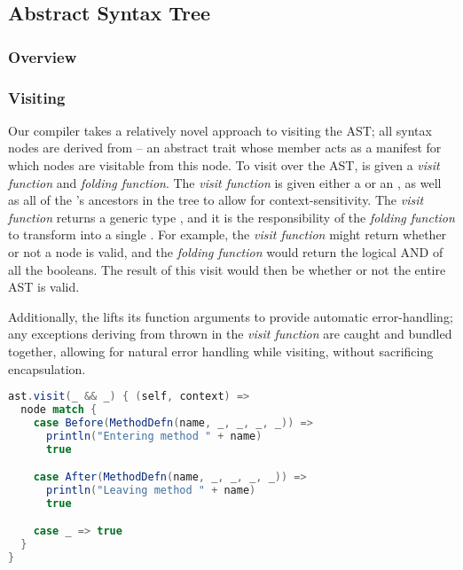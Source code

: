 \documentclass{article}
\begin{document}
\subsection{Abstract Syntax Tree}

\subsubsection{Overview}

\subsubsection{Visiting}

Our compiler takes a relatively novel approach to visiting the AST; all syntax nodes are derived from 
-- an abstract trait whose \value{children} member acts as a manifest for which nodes are visitable from this node. To
visit over the AST,  is given a \textit{visit function} and \textit{folding function}. The \textit{visit
function} is given either a \value{Before(Node)} or an \value{After(Node)}, as well as all of the \value{Node}'s
ancestors in the tree to allow for context-sensitivity. The \textit{visit function} returns a generic type ,
and it is the responsibility of the \textit{folding function} to transform  into a single . For
example, the \textit{visit function} might return whether or not a node is valid, and the \textit{folding function}
would return the logical AND of all the booleans. The result of this visit would then be whether or not the entire AST
is valid.

Additionally, the \value{Visitor} lifts its function arguments to provide automatic error-handling; any exceptions
deriving from  thrown in the \textit{visit function} are caught and bundled together, allowing for
natural error handling while visiting, without sacrificing encapsulation.


\begin{lstlisting}[language=Scala]
ast.visit(_ && _) { (self, context) =>
  node match {
    case Before(MethodDefn(name, _, _, _, _)) =>
      println("Entering method " + name)
      true

    case After(MethodDefn(name, _, _, _, _)) =>
      println("Leaving method " + name)
      true

    case _ => true
  }
}


\end{lstlisting}
\end{document}
